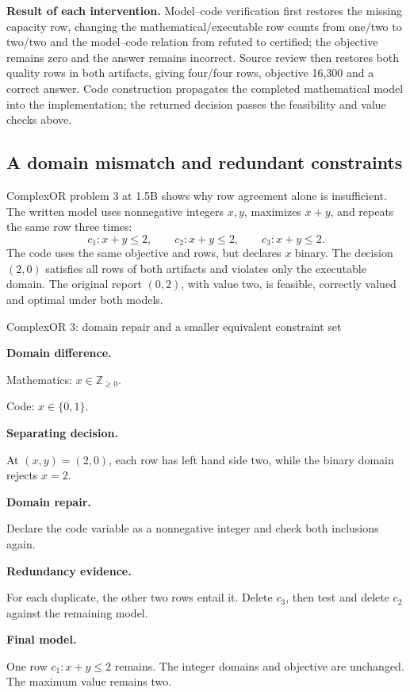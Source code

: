 \textbf{Result of each intervention.} Model--code verification first restores the missing capacity
row, changing the mathematical/executable row counts from one/two to two/two and the model--code
relation from refuted to certified; the objective remains zero and the answer remains incorrect.
Source review then restores both quality rows in both artifacts, giving four/four rows, objective
16,300 and a correct answer. Code construction propagates the completed mathematical model into the
implementation; the returned decision passes the feasibility and value checks above.

\subsection{A domain mismatch and redundant constraints}
\label{app:complexexample}

ComplexOR problem 3 at 1.5B shows why row agreement alone is insufficient. The written model uses
nonnegative integers \(x,y\), maximizes \(x+y\), and repeats the same row three times:
\begin{equation}
c_1:x+y\leq2,\qquad c_2:x+y\leq2,\qquad c_3:x+y\leq2.
\label{eq:complexrows}
\end{equation}
The code uses the same objective and rows, but declares \(x\) binary. The decision \((2,0)\)
satisfies all rows of both artifacts and violates only the executable domain. The original report
\((0,2)\), with value two, is feasible, correctly valued and optimal under both models.

\begin{evidencecase}{ComplexOR 3: domain repair and a smaller equivalent constraint set}
\begin{minipage}[t]{0.475\linewidth}\vspace{0pt}\small
\textcolor{verdictorange}{\textbf{Domain difference.}}\par
Mathematics: \(x\in\mathbb Z_{\geq0}\).\par
Code: \(x\in\{0,1\}\).\par\medskip
\textcolor{verdictorange}{\textbf{Separating decision.}}\par
At \((x,y)=(2,0)\), each row has left hand side two, while the binary domain rejects \(x=2\).\par\medskip
\textcolor{verdictgreen}{\textbf{Domain repair.}}\par
Declare the code variable as a nonnegative integer and check both inclusions again.
\end{minipage}\hfill
\begin{minipage}[t]{0.475\linewidth}\vspace{0pt}\small
\textcolor{verdictblue}{\textbf{Redundancy evidence.}}\par
For each duplicate, the other two rows entail it. Delete \(c_3\), then test and delete \(c_2\)
against the remaining model.\par\medskip
\textcolor{verdictgreen}{\textbf{Final model.}}\par
One row \(c_1:x+y\leq2\) remains. The integer domains and objective are unchanged. The maximum
value remains two.
\end{minipage}
\end{evidencecase}

